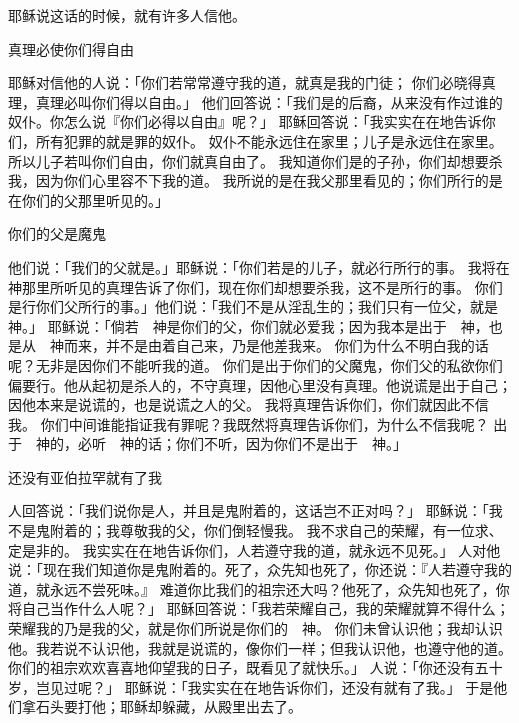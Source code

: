 {耶稣说这话的时候，就有许多人信他。
\par }{\SH 真理必使你们得自由
\par }{\PP {}耶稣对信他的{}人说：「你们若常常遵守我的道，就真是我的门徒；
你们必晓得真理，真理必叫你们得以自由。」
他们回答说：「我们是{}的后裔，从来没有作过谁的奴仆。你怎么说『你们必得以自由』呢？」
耶稣回答说：「我实实在在地告诉你们，所有犯罪的就是罪的奴仆。
奴仆不能永远住在家里；儿子是永远住在家里。
所以{}儿子若叫你们自由，你们就真自由了。
我知道你们是{}的子孙，你们却想要杀我，因为你们心里容不下我的道。
我所说的是在我父那里看见的；你们所行的是在你们的父那里听见的。」
\par }{\SH 你们的父是魔鬼
\par }{\PP {}他们说：「我们的父就是{}。」耶稣说：「你们若是{}的儿子，就必行{}所行的事。
我将在　神那里所听见的真理告诉了你们，现在你们却想要杀我，这不是{}所行的事。
你们是行你们父所行的事。」他们说：「我们不是从淫乱生的；我们只有一位父，就是　神。」
耶稣说：「倘若　神是你们的父，你们就必爱我；因为我本是出于　神，也是从　神而来，并不是由着自己来，乃是他差我来。
你们为什么不明白我的话呢？无非是因你们不能听我的道。
你们是出于你们的父魔鬼，你们父的私欲你们偏要行。他从起初是杀人的，不守真理，因他心里没有真理。他说谎是出于自己；因他本来是说谎的，也是说谎之人的父。
我将真理告诉你们，你们就因此不信我。
你们中间谁能指证我有罪呢？我既然将真理告诉你们，为什么不信我呢？
出于　神的，必听　神的话；你们不听，因为你们不是出于　神。」
\par }{\SH 还没有亚伯拉罕就有了我
\par }{\PP {}人回答说：「我们说你是{}人，并且是鬼附着的，这话岂不正对吗？」
耶稣说：「我不是鬼附着的；我尊敬我的父，你们倒轻慢我。
我不求自己的荣耀，有一位{}求{}、定是非的。
我实实在在地告诉你们，人若遵守我的道，就永远不见死。」
人对他说：「现在我们知道你是鬼附着的。{}死了，众先知也死了，你还说：『人若遵守我的道，就永远不尝死味。』
难道你比我们的祖宗{}还大吗？他死了，众先知也死了，你将自己当作什么人呢？」
耶稣回答说：「我若荣耀自己，我的荣耀就算不得什么；荣耀我的乃是我的父，就是你们所说是你们的　神。
你们未曾认识他；我却认识他。我若说不认识他，我就是说谎的，像你们一样；但我认识他，也遵守他的道。
你们的祖宗{}欢欢喜喜地仰望我的日子，既看见了就快乐。」
人说：「你还没有五十岁，岂见过{}呢？」
耶稣说：「我实实在在地告诉你们，还没有{}就有了我。」
于是他们拿石头要打他；耶稣却躲藏，从殿里出去了。

}
